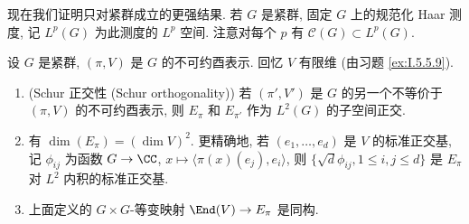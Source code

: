 现在我们证明只对紧群成立的更强结果. 若 $G$ 是紧群, 固定 $G$ 上的规范化 Haar 测度, 记 $L^p(G)$ 为此测度的 $L^p$ 空间. 注意对每个 $p$ 有 $\mathcal{C}(G) \subset L^p(G)$.

\begin{theorem}
\label{thm:IV.3.8}
设 $G$ 是紧群, $(\pi, V)$ 是 $G$ 的不可约酉表示. 回忆 $V$ 有限维 (由习题 \ref{ex:I.5.5.9}).
\begin{enumerate}
\item[(i)] (Schur 正交性 (Schur orthogonality)) 若 $(\pi', V')$ 是 $G$ 的另一个不等价于 $(\pi, V)$ 的不可约酉表示, 则 $E_{\pi}$ 和 $E_{\pi'}$ 作为 $L^2(G)$ 的子空间正交.
\item[(ii)] 有 $\dim(E_{\pi}) = (\dim V)^2$. 更精确地, 若 $(e_1, \ldots, e_d)$ 是 $V$ 的标准正交基, 记 $\phi_{ij}$ 为函数 $G \to \CC$, $x \longmapsto \langle \pi(x)(e_j), e_i \rangle$, 则 $\{\sqrt{d}\phi_{ij}, 1 \leq i, j \leq d\}$ 是 $E_{\pi}$ 对 $L^2$ 内积的标准正交基.
\item[(iii)] 上面定义的 $G \times G$-等变映射 $\End(V) \to E_{\pi}$ 是同构.
\end{enumerate}
\end{theorem}

